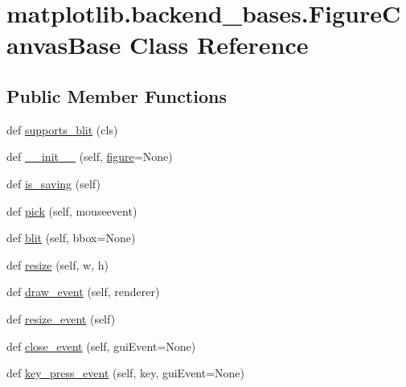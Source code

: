 \hypertarget{classmatplotlib_1_1backend__bases_1_1FigureCanvasBase}{}\section{matplotlib.\+backend\+\_\+bases.\+Figure\+Canvas\+Base Class Reference}
\label{classmatplotlib_1_1backend__bases_1_1FigureCanvasBase}
\subsection*{Public Member Functions}
\begin{DoxyCompactItemize}
\item 
def \hyperlink{classmatplotlib_1_1backend__bases_1_1FigureCanvasBase_ae14767b5eeab37156694190c85b8120f}{supports\+\_\+blit} (cls)
\item 
def \hyperlink{classmatplotlib_1_1backend__bases_1_1FigureCanvasBase_a1e29f76c4766bfd6e06305bce01144a2}{\+\_\+\+\_\+init\+\_\+\+\_\+} (self, \hyperlink{classmatplotlib_1_1backend__bases_1_1FigureCanvasBase_aa5120a3253575aac5d0e280f5debcff7}{figure}=None)
\item 
def \hyperlink{classmatplotlib_1_1backend__bases_1_1FigureCanvasBase_a96ac4833a333fdbf9dbec92f7cc69d3f}{is\+\_\+saving} (self)
\item 
def \hyperlink{classmatplotlib_1_1backend__bases_1_1FigureCanvasBase_a132a4afa197d0a77bb594549d4c2dd63}{pick} (self, mouseevent)
\item 
def \hyperlink{classmatplotlib_1_1backend__bases_1_1FigureCanvasBase_a0620931beb95e96e60122cf8bf22b73e}{blit} (self, bbox=None)
\item 
def \hyperlink{classmatplotlib_1_1backend__bases_1_1FigureCanvasBase_a489f7ab6594c4f9c189f5a0f7dcb48cf}{resize} (self, w, h)
\item 
def \hyperlink{classmatplotlib_1_1backend__bases_1_1FigureCanvasBase_a8af192a22fb405b82e720c97c4e8144a}{draw\+\_\+event} (self, renderer)
\item 
def \hyperlink{classmatplotlib_1_1backend__bases_1_1FigureCanvasBase_ae67d2430644c866bf347ea5d6e55fedb}{resize\+\_\+event} (self)
\item 
def \hyperlink{classmatplotlib_1_1backend__bases_1_1FigureCanvasBase_a6170cc3bfe641e6857c0fa4e956cd419}{close\+\_\+event} (self, gui\+Event=None)
\item 
def \hyperlink{classmatplotlib_1_1backend__bases_1_1FigureCanvasBase_a43b10c3b411e5e9c68d02eb2cef4ddeb}{key\+\_\+press\+\_\+event} (self, key, gui\+Event=None)

\end{DoxyCompactItemize}

